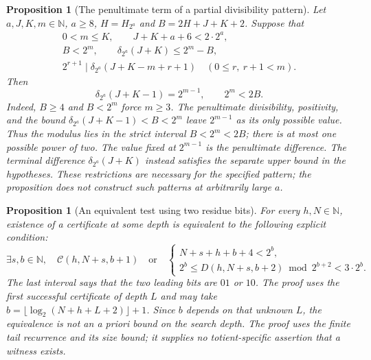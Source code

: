 \documentclass[11pt]{article}
\theoremstyle{plain}
\newtheorem{prop}[thm]{Proposition}
\theoremstyle{definition}
\theoremstyle{remark}
\begin{document}
\begin{prop}[The penultimate term of a partial divisibility pattern]\label{prop:TE-02-inv}
Let $a,J,K,m\in\mathbb N$, $a\ge8$, $H=H_{2^a}$ and
$B=2H+J+K+2$. Suppose that
\[
\begin{gathered}
 0<m\le K,\qquad J+K+a+6<2\cdot2^a,\\
 B<2^m,\qquad \delta_{2^a}(J+K)\le2^m-B,\\
 2^{r+1}\mid\delta_{2^a}(J+K-m+r+1)
       \quad(0\le r,\ r+1<m).
\end{gathered}
\]
Then
\[
 \delta_{2^a}(J+K-1)=2^{m-1},\qquad 2^m<2B.
\]
Indeed, $B\ge4$ and $B<2^m$ force $m\ge3$. The penultimate
divisibility, positivity, and the bound
$\delta_{2^a}(J+K-1)<B<2^m$ leave $2^{m-1}$ as its only possible
value. Thus the modulus lies in the strict interval $B<2^m<2B$;
there is at most one possible power of two. The value fixed at
$2^{m-1}$ is the \emph{penultimate} difference. The terminal
difference $\delta_{2^a}(J+K)$ instead satisfies the separate upper
bound in the hypotheses. These restrictions are necessary for the
specified pattern; the proposition does not construct such patterns
at arbitrarily large $a$.
\end{prop}

\begin{prop}[An equivalent test using two residue bits]\label{prop:TE-03-inv}
For every $h,N\in\mathbb N$, existence of a certificate at some
depth is equivalent to the following explicit condition:
\[
 \exists s,b\in\mathbb N,\quad
 \mathcal C(h,N+s,b+1)\quad\text{or}\quad
 \begin{cases}
  N+s+h+b+4<2^b,\\
  2^b\le D(h,N+s,b+2)\bmod2^{b+2}<3\cdot2^b.
 \end{cases}
\]
The last interval says that the two leading bits are $01$ or $10$.
The proof uses the first successful certificate of depth $L$ and may
take $b=\lfloor\log_2(N+h+L+2)\rfloor+1$. Since $b$ depends on that
unknown $L$, the equivalence is not an a priori bound on the search
depth. The proof uses the finite tail recurrence and its size bound;
it supplies no totient-specific assertion that a witness exists.
\end{prop}
\end{document}
